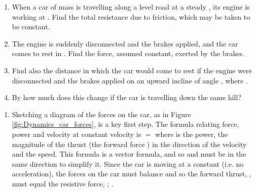 
\begin{problem}[A1961AMIQ2a] %
{\begin{enumerate}
	\item When a car of mass  is travelling along a level road at a steady , its engine is working at . Find the total resistance due to friction, which may be taken to be constant.
	\item The engine is suddenly disconnected and the brakes applied, and the car comes to rest in . Find the force, assumed constant, exerted by the brakes.
	\item Find also the distance in which the car would come to rest if the engine were disconnected and the brakes applied on an upward incline of angle \vari{\theta}, where .
	\item By how much does this change if the car is travelling down the same hill?
\end{enumerate}
}{
}{
\begin{enumerate}
	\item Sketching a diagram of the forces on the car, as in Figure \ref{fig:Dynamics_car_forces}, is a key first step. The formula relating force, power and velocity at constant velocity is  $=$  where  is the power,  the magnitude of the thrust (the forward force ) in the direction of the velocity and  the speed. This formula is a vector formula, and so  and  must be in the same direction to simplify it. Since the car is moving at a constant  (i.e. no acceleration), the forces on the car must balance and so the forward thrust, , must equal the resistive force, ; .


\end{enumerate}}
\end{problem}
